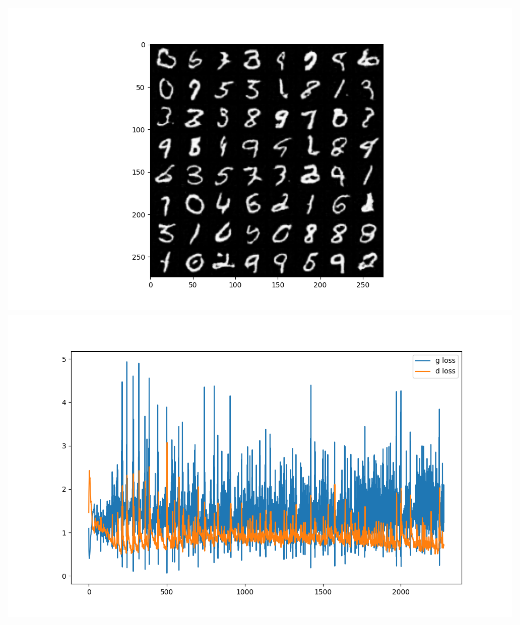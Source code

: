 \includegraphics{./images/Pasted image 20231228121211.png}\includegraphics{./images/Pasted image 20231228121251.png}

